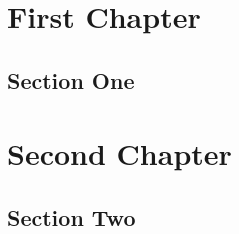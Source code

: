 \documentclass[a5paper, landscape]{book}
\begin{document}
\chapter{First Chapter}
\section{Section One}
\lipsum[1-2]

\chapter{Second Chapter}
\section{Section Two}
\lipsum[3-4]
\end{document}
